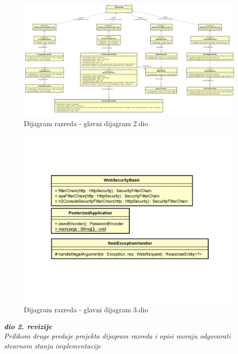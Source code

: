 			\begin{figure}[H]
				\includegraphics[scale=0.4]{slike/glavni_2.png}%
				\centering
				\caption{Dijagram razreda - glavni dijagram 2.dio}
				\label{fig:promjena9.2}
			\end{figure}
			
			\begin{figure}[H]
				\includegraphics[scale=0.5]{slike/glavni_3.png}%
				\centering
				\caption{Dijagram razreda - glavni dijagram 3.dio}
				\label{fig:promjena9.3}
			\end{figure}
			\eject



			\textbf{\textit{dio 2. revizije}}\\			
			
			\textit{Prilikom druge predaje projekta dijagram razreda i opisi moraju odgovarati stvarnom stanju implementacije}
			
